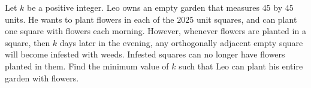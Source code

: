 Let $k$ be a positive integer. Leo owns an empty garden that measures $45$ by $45$ units.
He wants to plant flowers in each of the $2025$ unit squares, and can plant one square with flowers each morning.
However, whenever flowers are planted in a square, then $k$ days later in the evening,
any orthogonally adjacent empty square will become infested with weeds.
Infested squares can no longer have flowers planted in them.
Find the minimum value of $k$ such that Leo can plant his entire garden with flowers.
